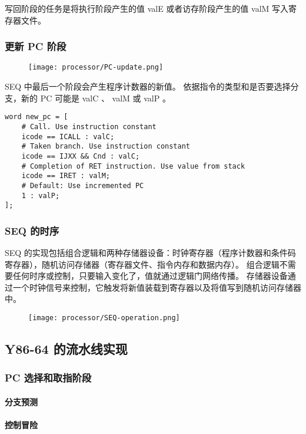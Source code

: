 写回阶段的任务是将执行阶段产生的值 valE 或者访存阶段产生的值 valM 写入寄存器文件。

\subsubsection{更新 PC 阶段}
\begin{figure}[H]
    \centering
    \texttt{[image: processor/PC-update.png]}
\end{figure}

SEQ 中最后一个阶段会产生程序计数器的新值。
依据指令的类型和是否要选择分支，新的 PC 可能是 valC 、 valM 或 valP 。
\begin{lstlisting}[style=CStyle]
word new_pc = [
    # Call. Use instruction constant
    icode == ICALL : valC;
    # Taken branch. Use instruction constant
    icode == IJXX && Cnd : valC;
    # Completion of RET instruction. Use value from stack
    icode == IRET : valM;
    # Default: Use incremented PC
    1 : valP;
];
\end{lstlisting}

\subsubsection{SEQ 的时序}

SEQ 的实现包括组合逻辑和两种存储器设备：时钟寄存器（程序计数器和条件码寄存器），随机访问存储器（寄存器文件、指令内存和数据内存）。
组合逻辑不需要任何时序或控制，只要输入变化了，值就通过逻辑门网络传播。
存储器设备通过一个时钟信号来控制，它触发将新值装载到寄存器以及将值写到随机访问存储器中。

\begin{figure}[H]
    \centering
    \texttt{[image: processor/SEQ-operation.png]}
\end{figure}

\subsection{Y86-64 的流水线实现}

\subsubsection{PC 选择和取指阶段}
\paragraph{分支预测}
\paragraph{控制冒险}
